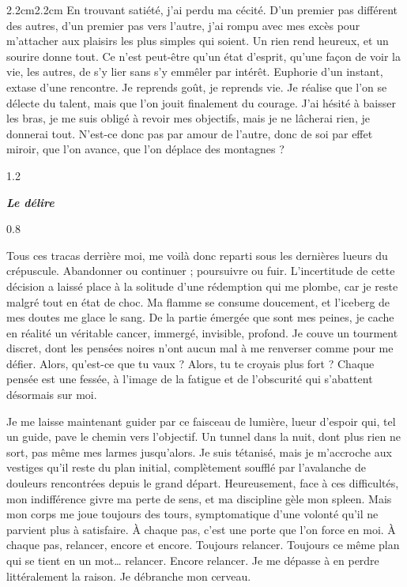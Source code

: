 \begin{adjustwidth}{2.2cm}{2.2cm}
En trouvant satiété, j’ai perdu ma cécité. D’un premier pas différent des autres, d’un premier pas vers l’autre, j’ai rompu avec mes excès pour m’attacher aux plaisirs les plus simples qui soient. Un rien rend heureux, et un sourire donne tout. Ce n’est peut-être qu’un état d’esprit, qu’une façon de voir la vie, les autres, de s’y lier sans s’y emmêler par intérêt. Euphorie d’un instant, extase d’une rencontre. Je reprends goût, je reprends vie. Je réalise que l’on se délecte du talent, mais que l’on jouit finalement du courage. J’ai hésité à baisser les bras, je me suis obligé à revoir mes objectifs, mais je ne lâcherai rien, je donnerai tout. N’est-ce donc pas par amour de l’autre, donc de soi par effet miroir, que l’on avance, que l’on déplace des montagnes ?
\begin{spacing}{1.2}
~
\end{spacing}
\begin{center}
\textbf{\textit{Le délire}}
\end{center}
\begin{spacing}{0.8}
~
\end{spacing}
Tous ces tracas derrière moi, me voilà donc reparti sous les dernières lueurs du crépuscule. Abandonner ou continuer ; poursuivre ou fuir. L’incertitude de cette décision a laissé place à la solitude d’une rédemption qui me plombe, car je reste malgré tout en état de choc. Ma flamme se consume doucement, et l’iceberg de mes doutes me glace le sang. De la partie émergée que sont mes peines, je cache en réalité un véritable cancer, immergé, invisible, profond. Je couve un tourment discret, dont les pensées noires n’ont aucun mal à me renverser comme pour me défier. Alors, qu’est-ce que tu vaux ? Alors, tu te croyais plus fort ? Chaque pensée est une fessée, à l’image de la fatigue et de l’obscurité qui s’abattent désormais sur moi.

Je me laisse maintenant guider par ce faisceau de lumière, lueur d’espoir qui, tel un guide, pave le chemin vers l’objectif. Un tunnel dans la nuit, dont plus rien ne sort, pas même mes larmes jusqu’alors. Je suis tétanisé, mais je m’accroche aux vestiges qu’il reste du plan initial, complètement soufflé par l’avalanche de douleurs rencontrées depuis le grand départ. Heureusement, face à ces difficultés, mon indifférence givre ma perte de sens, et ma discipline gèle mon spleen. Mais mon corps me joue toujours des tours, symptomatique d’une volonté qu’il ne parvient plus à satisfaire. À chaque pas, c’est une porte que l’on force en moi. À chaque pas, relancer, encore et encore. Toujours relancer. Toujours ce même plan qui se tient en un mot… relancer. Encore relancer. Je me dépasse à en perdre littéralement la raison. Je débranche mon cerveau.


\end{adjustwidth}
